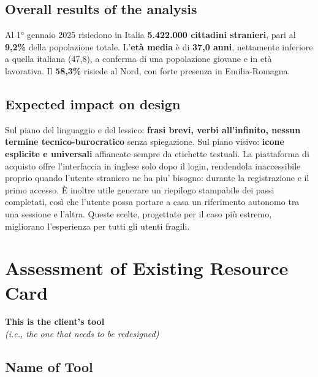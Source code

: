 \documentclass[11pt,a4paper]{article}
\begin{document}
\subsection*{Overall results of the analysis}
\begin{tcolorbox}[colback=backgroundColor,colframe=borderColor,arc=2mm]
Al 1° gennaio 2025 risiedono in Italia \textbf{5.422.000 cittadini
stranieri}, pari al \textbf{9,2\%} della popolazione totale.
L'\textbf{età media} è di \textbf{37,0 anni}, nettamente inferiore a
quella italiana (47,8), a conferma di una popolazione giovane e in età
lavorativa. Il \textbf{58,3\%} risiede al Nord, con forte presenza in
Emilia-Romagna.
\end{tcolorbox}

\subsection*{Expected impact on design}
\begin{tcolorbox}[colback=backgroundColor,colframe=borderColor,arc=2mm]
Sul piano del linguaggio e del lessico: \textbf{frasi brevi, verbi
all'infinito, nessun termine tecnico-burocratico} senza spiegazione.
Sul piano visivo: \textbf{icone esplicite e universali} affiancate
sempre da etichette testuali. La piattaforma di acquisto offre l'interfaccia in inglese solo dopo il login, rendendola inaccessibile proprio quando l'utente straniero ne ha piu' bisogno: durante la registrazione e il primo accesso. È inoltre utile
generare un riepilogo stampabile dei passi completati, così che
l'utente possa portare a casa un riferimento autonomo tra una
sessione e l'altra. Queste scelte, progettate per il caso più
estremo, migliorano l'esperienza per tutti gli utenti fragili.
\end{tcolorbox}

\newpage
\section*{Assessment of Existing Resource Card}

\textbf{This is the client's tool}\\
\textit{(i.e., the one that needs to be redesigned)}

\bigskip

\subsection*{Name of Tool}
\end{document}
